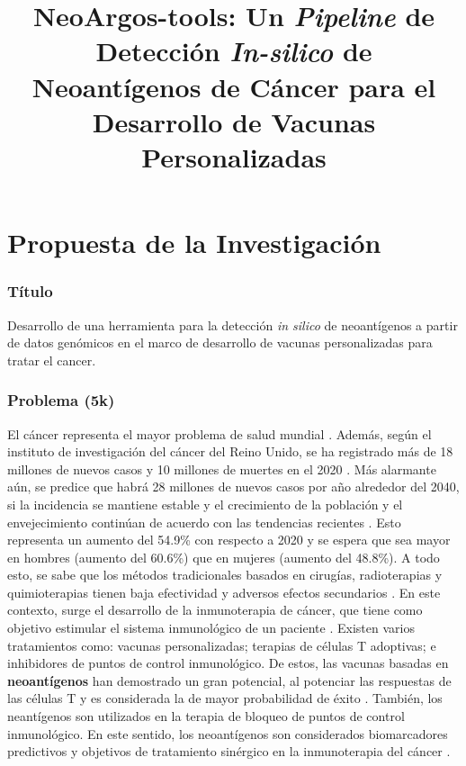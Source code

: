 \documentclass[a4paper,11pt]{article}
\title{ 
	
	NeoArgos-tools: Un \textit{Pipeline} de Detección \textit{In-silico} de Neoantígenos de Cáncer para el Desarrollo de Vacunas Personalizadas
}
\author{}
\date{}
\begin{document}
	

	
	
	
	
	
	
	

\part*{Propuesta de la Investigación}

\section{Título}
Desarrollo de una herramienta  para la detección \textit{in silico} de neoantígenos a partir de datos genómicos en el marco de desarrollo de vacunas personalizadas para tratar el cancer.

\section{Problema (5k) }

El cáncer representa el mayor problema de salud mundial \cite{siegel2023cancer}. Además, según el instituto de investigación del cáncer del Reino Unido, se ha registrado más de 18 millones de nuevos casos y 10 millones de muertes en el 2020 \cite{cancerUK2023}. Más alarmante aún, se predice que habrá 28 millones de nuevos casos por año alrededor del 2040, si la incidencia se mantiene estable y el crecimiento de la población y el envejecimiento continúan de acuerdo con las tendencias recientes \cite{cancerUK2023_2}. Esto representa un aumento del 54.9\% con respecto a 2020 y se espera que sea mayor en hombres (aumento del 60.6\%) que en mujeres (aumento del 48.8\%).	A todo esto, se sabe que los métodos tradicionales basados en cirugías, radioterapias y quimioterapias tienen baja efectividad y adversos efectos secundarios \cite{peng2019neoantigen}. En este contexto, surge el desarrollo de la inmunoterapia de cáncer, que tiene como objetivo estimular el sistema inmunológico de un paciente \cite{borden2022cancer}. Existen varios tratamientos como: vacunas personalizadas; terapias de células T adoptivas; e inhibidores de puntos de control inmunológico. De estos, las vacunas basadas en \textbf{neoantígenos} han demostrado un gran potencial, al potenciar las respuestas de las células T y es considerada la de mayor probabilidad de éxito \cite{borden2022cancer}. También, los neantígenos son utilizados en la terapia de bloqueo de puntos de control inmunológico. En este sentido, los neoantígenos son considerados biomarcadores predictivos y objetivos de tratamiento sinérgico en la inmunoterapia del cáncer \cite{fang2022neoantigens}.
\end{document}
